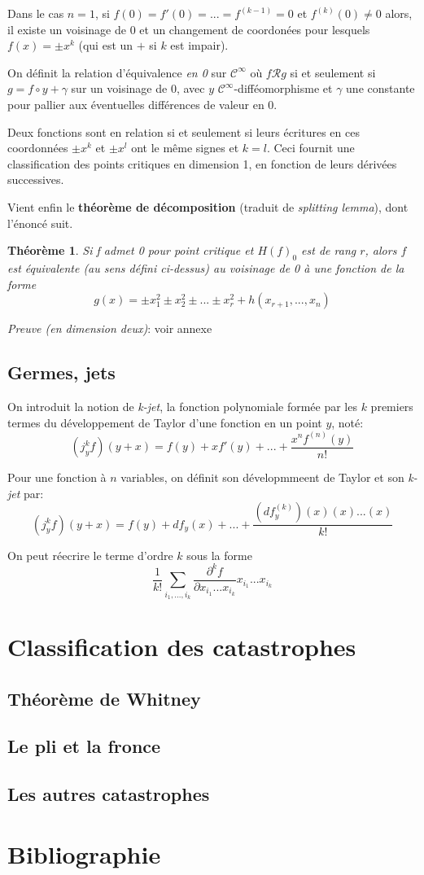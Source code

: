 \documentclass{article}
\newtheorem{thm}{Théorème}
\begin{document}
Dans le cas $n=1$, si $f(0)=f'(0)=...=f^{(k-1)}=0$ et $f^{(k)}(0)\neq 0$ alors, il existe un voisinage de 0 et un changement de coordonées pour lesquels $f(x)=\pm x^k$ (qui est un $+$ si $k$ est impair).

On définit la relation d'équivalence \textit{en 0} sur $\mathcal{C}^\infty$ où $f \mathcal{R} g$ si et seulement si $g=f\circ y + \gamma$ sur un voisinage de 0, avec $y$ $\mathcal{C}^\infty$-difféomorphisme et $\gamma$ une constante pour pallier aux éventuelles différences de valeur en 0.

Deux fonctions sont en relation si et seulement si leurs écritures en ces coordonnées $\pm x^k$ et $\pm x^l$ ont le même signes et $k=l$. Ceci fournit une classification des points critiques en dimension 1, en fonction de leurs dérivées successives.

Vient enfin le \textbf{théorème de décomposition} (traduit de \textit{splitting lemma}), dont l'énoncé suit.

\begin{thm}
Si f admet 0 pour point critique et $H(f)_0$ est de rang $r$, alors $f$ est équivalente (au sens défini ci-dessus) au voisinage de 0 à une fonction de la forme $$g(x)=\pm x_1^2\pm x_2^2\pm ... \pm x_r^2 + h(x_{r+1},...,x_n)$$
\end{thm}

\textit{Preuve (en dimension deux)}: voir annexe


\subsection{Germes, jets}

On introduit la notion de \textit{k-jet}, la fonction polynomiale formée par les $k$ premiers termes du développement de Taylor d'une fonction en un point $y$, noté: $$(j^k_y f)(y+x) = f(y) + xf'(y)+...+\frac{x^n f^{(n)}(y)}{n!}$$

Pour une fonction à $n$ variables, on définit son dévelopmmeent de Taylor et son \textit{k-jet} par: $$(j^k_y f)(y+x) = f(y) + df_y(x)+...+\frac{(df^{(k)}_y)(x)(x)...(x)}{k!}$$

On peut réecrire le terme d'ordre $k$ sous la forme $$\frac{1}{k!}\sum_{i_1,...,i_k} \frac{\partial^k f}{\partial x_{i_1}...x_{i_k}} x_{i_1}...x_{i_k}$$

\section{Classification des catastrophes}
\subsection{Théorème de Whitney}
\subsection{Le pli et la fronce}
\subsection{Les autres catastrophes}

\section{Bibliographie}

\renewcommand\refname{\vskip -1cm}


\end{document}
